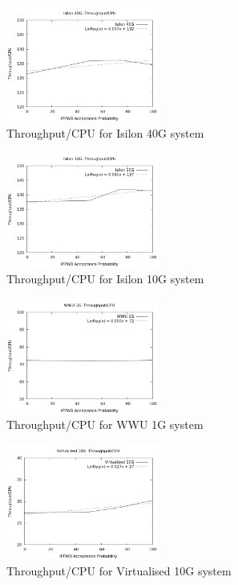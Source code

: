 \documentclass[journal]{IEEEtran}
\begin{document}
    \begin{figure}[h]
      \includegraphics[width=0.45\textwidth]{toc_isilon40}
      \caption{Throughput/CPU for Isilon 40G system}
      \label{fig:isilontoc40}
    \end{figure}
    \begin{figure}[h]
      \includegraphics[width=0.45\textwidth]{toc_isilon10}
      \caption{Throughput/CPU for Isilon 10G system}
      \label{fig:isilontoc10}
    \end{figure}
    \begin{figure}[h]
      \includegraphics[width=0.45\textwidth]{toc_wwu1}
      \caption{Throughput/CPU for WWU 1G system}
      \label{fig:wwutoc1}
    \end{figure}
    \begin{figure}[h]
      \includegraphics[width=0.45\textwidth]{toc_virtual10}
      \caption{Throughput/CPU for Virtualised 10G system}
      \label{fig:virtualtoc10}
    \end{figure}
\end{document}
